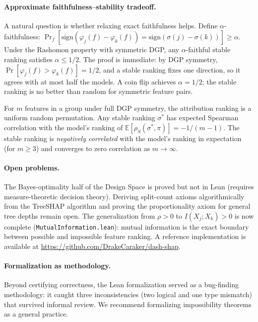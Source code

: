 \documentclass{article}
\newcommand{\E}{\mathbb{E}}
\begin{document}
\paragraph{Approximate faithfulness--stability tradeoff.}
A natural question is whether relaxing exact faithfulness helps. Define $\alpha$-faithfulness: $\Pr_f[\text{sign}(\varphi_j(f) - \varphi_k(f)) = \text{sign}(\sigma(j) - \sigma(k))] \geq \alpha$. Under the Rashomon property with symmetric DGP, any $\alpha$-faithful stable ranking satisfies $\alpha \leq 1/2$. The proof is immediate: by DGP symmetry, $\Pr[\varphi_j(f) > \varphi_k(f)] = 1/2$, and a stable ranking fixes one direction, so it agrees with at most half the models. A coin flip achieves $\alpha = 1/2$; the stable ranking is no better than random for symmetric feature pairs.

For $m$ features in a group under full DGP symmetry, the attribution ranking is a uniform random permutation. Any stable ranking $\sigma^*$ has expected Spearman correlation with the model's ranking of $\E[\rho_S(\sigma^*, \pi)] = -1/(m-1)$. The stable ranking is \emph{negatively correlated} with the model's ranking in expectation (for $m \geq 3$) and converges to zero correlation as $m \to \infty$.

\paragraph{Open problems.}
The Bayes-optimality half of the Design Space is proved but not in Lean (requires measure-theoretic decision theory). Deriving split-count axioms algorithmically from the TreeSHAP algorithm and proving the proportionality axiom for general tree depths remain open. The generalization from $\rho > 0$ to $I(X_j; X_k) > 0$ is now complete (\texttt{MutualInformation.lean}): mutual information is the exact boundary between possible and impossible feature ranking. A reference implementation is available at \url{https://github.com/DrakeCaraker/dash-shap}.

\paragraph{Formalization as methodology.}
Beyond certifying correctness, the Lean formalization served as a bug-finding methodology: it caught three inconsistencies (two logical and one type mismatch) that survived informal review. We recommend formalizing impossibility theorems as a general practice.

\end{document}
